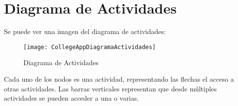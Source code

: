 %
%
%
%

\cleardoublepage
\chapter{Diagrama de Actividades}
\label{chap:activitiesdiagram}

Se puede ver una imagen del diagrama de actividades:

\begin{figure}[h !]
	\centering
	\texttt{[image: CollegeAppDiagramaActividades]}
	\caption{Diagrama de Actividades}
	\label{fig:ActivitiesDiagram}
\end{figure}

Cada uno de los nodos es una actividad, representando las flechas el acceso a otras actividades. Las barras verticales representan que desde múltiples actividades se pueden acceder a una o varias.